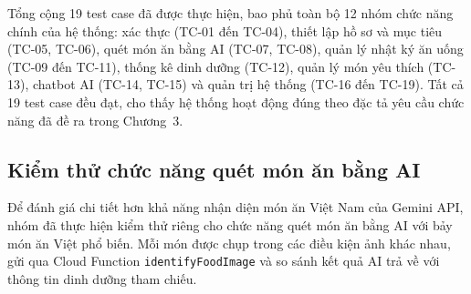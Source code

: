 Tổng cộng 19 test case đã được thực hiện, bao phủ toàn bộ 12 nhóm chức năng chính của hệ thống: xác thực (TC-01 đến TC-04), thiết lập hồ sơ và mục tiêu (TC-05, TC-06), quét món ăn bằng AI (TC-07, TC-08), quản lý nhật ký ăn uống (TC-09 đến TC-11), thống kê dinh dưỡng (TC-12), quản lý món yêu thích (TC-13), chatbot AI (TC-14, TC-15) và quản trị hệ thống (TC-16 đến TC-19). Tất cả 19 test case đều đạt, cho thấy hệ thống hoạt động đúng theo đặc tả yêu cầu chức năng đã đề ra trong Chương~3.

\subsection{Kiểm thử chức năng quét món ăn bằng AI}

Để đánh giá chi tiết hơn khả năng nhận diện món ăn Việt Nam của Gemini API, nhóm đã thực hiện kiểm thử riêng cho chức năng quét món ăn bằng AI với bảy món ăn Việt phổ biến. Mỗi món được chụp trong các điều kiện ảnh khác nhau, gửi qua Cloud Function \texttt{identifyFoodImage} và so sánh kết quả AI trả về với thông tin dinh dưỡng tham chiếu.

